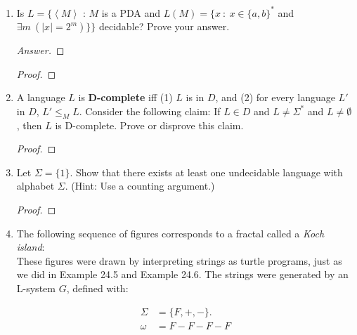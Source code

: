 \documentclass[10pt]{article}
\newcommand{\card}[1]{\left| #1 \right|}
\newcommand{\brackets}[1]{\left< #1 \right>}
\begin{document}
\begin{enumerate}[1)]
//TODO: include graphics\\

Is $s \in TILES$?  Prove your answer.
\begin{proof}[Answer]
\end{proof}
\begin{proof}[Proof]
\end{proof}


\item
Is $L = \{\brackets{M}$ : $M$ is a PDA and $L(M) = \{x\ :\ x \in \{a, b\}^*$ and $\exists m\ (\card{x} = 2^m)\}\}$ decidable?  Prove your answer.
\begin{proof}[Answer]
\end{proof}
\begin{proof}[Proof]
\end{proof}


\item
A language $L$ is \textbf{D-complete} iff (1)  $L$ is in $D$, and (2) for every language  $L'$ in $D$,  $L' \leq _M L$.  Consider the following claim: If $L \in D$ and $L \neq \Sigma ^*$ and $L \neq \emptyset$, then $L$ is D-complete.  Prove or disprove this claim.
\begin{proof}[Proof]
\end{proof}


\item
Let $\Sigma = \{1\}$.  Show that there exists at least one undecidable language with alphabet $\Sigma$.   (Hint: Use a counting argument.)
\begin{proof}[Proof]
\end{proof}


\item
The following sequence of figures corresponds to a fractal called a \textit{Koch island}:\\


These figures were drawn by interpreting strings as turtle programs, just as we did in Example 24.5 and Example 24.6.  The strings were generated by an L-system $G$, defined with:

\begin{align*}
\Sigma &= \{F, +, -\}.\\
\omega &= F - F - F - F
\end{align*}


\end{enumerate}
\end{document}
